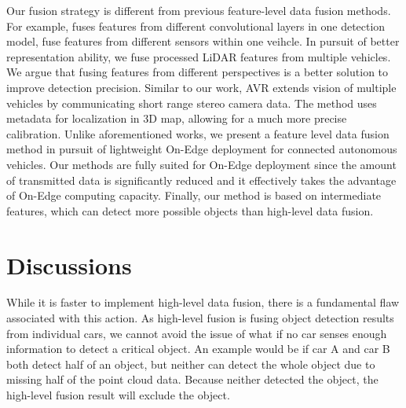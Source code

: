 \documentclass[sigconf]{acmart}
\begin{document}
Our fusion strategy is different from previous feature-level data fusion methods. For example, \cite{lin2017feature} fuses features from different convolutional layers in one detection model, \cite{chen2017multi,liang2018deep} fuse features from different sensors within one veihcle. In pursuit of better representation ability, we fuse processed LiDAR features from multiple vehicles. We argue that fusing features from different perspectives is a better solution to improve detection precision. Similar to our work, AVR \cite{qiu2018avr} extends vision of multiple vehicles by communicating short range stereo camera data. The method uses metadata for localization in 3D map, allowing for a much more precise calibration.
Unlike aforementioned works, we present a feature level data fusion method in pursuit of lightweight On-Edge deployment for connected autonomous vehicles.
Our methods are fully suited for On-Edge deployment since the amount of transmitted data is significantly reduced and it effectively takes the advantage of On-Edge computing capacity. Finally, our method is based on intermediate features, which can detect more possible objects than high-level data fusion.











































\section{Discussions}













While it is faster to implement high-level data fusion, there is a fundamental flaw associated with this action. As high-level fusion is fusing object detection results from individual cars, we cannot avoid the issue of what if no car senses enough information to detect a critical object. An example would be if car A and car B both detect half of an object, but neither can detect the whole object due to missing half of the point cloud data. Because neither detected the object, the high-level fusion result will exclude the object. 
\end{document}
